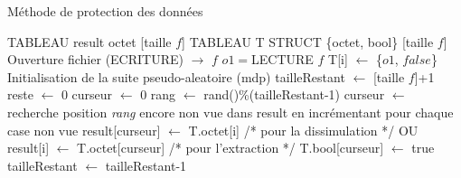 \documentclass[11pt]{article}
\begin{document}
\begin{minipage}{.4\textwidth}
\begin{algorithm}[H]
\caption{Méthode de protection des données}
\begin{algorithmic}
\footnotesize
\STATE TABLEAU result {octet} [taille $f$]
\STATE TABLEAU T STRUCT \{octet, bool\} [taille $f$]
\STATE Ouverture fichier (ECRITURE) $\rightarrow$ $f$
\STATE $o1 = $LECTURE $f$
\STATE T[i] $\leftarrow$ \{$o1$, $false$\}
\ENDFOR
\STATE Initialisation de la suite pseudo-aleatoire (mdp)
\STATE tailleRestant $\leftarrow$ [taille $f$]+1
\STATE reste $\leftarrow$ 0
\STATE curseur $\leftarrow$ 0
\STATE rang $\leftarrow$ rand()\%(tailleRestant-1)
\STATE curseur $\leftarrow$ recherche position \textit{rang} encore non vue 
dans result en incrémentant pour chaque case non vue
\color{red}
\STATE result[curseur] $\leftarrow$ T.octet[i] /* pour la dissimulation */
\color{black} OU \color{blue} result[i] $\leftarrow$ T.octet[curseur] /* pour l'extraction */
\color{black}
\STATE T.bool[curseur] $\leftarrow$ true
\STATE tailleRestant $\leftarrow$ tailleRestant-1
\ENDFOR
\normalsize
\end{algorithmic}
\end{algorithm}
\end{minipage}
\end{document}

